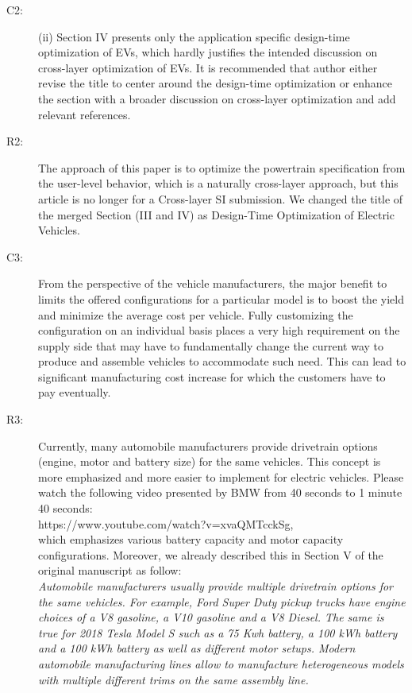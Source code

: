\documentclass[onecolumn]{IEEEconf}
\begin{document}
\begin{description}
\item [C2: ] (ii) Section IV presents only the application specific design-time optimization of EVs, which hardly justifies the intended discussion on cross-layer optimization of EVs. It is recommended that author either revise the title to center around the design-time optimization or enhance the section with a broader discussion on cross-layer optimization and add relevant references.
\item [R2: ]  The approach of this paper is to optimize the powertrain specification from the user-level behavior, which is a naturally cross-layer approach, but this article is no longer for a Cross-layer SI submission. We changed the title of the merged Section (III and IV) as Design-Time Optimization of Electric Vehicles.
~\\

\item [C3: ] From the perspective of the vehicle manufacturers, the major benefit to limits the offered configurations for a particular model is to boost the yield and minimize the average cost per vehicle. Fully customizing the configuration on an individual basis places a very high requirement on the supply side that may have to fundamentally change the current way to produce and assemble vehicles to accommodate such need. This can lead to significant manufacturing cost increase for which the customers have to pay eventually. 
\item [R3: ] Currently, many automobile manufacturers provide drivetrain options (engine, motor and battery size) for the same vehicles. This concept is more emphasized and more easier to implement for electric vehicles. Please watch the following video presented by BMW from 40 seconds to 1 minute 40 seconds: \\
https://www.youtube.com/watch?v=xvaQMTcckSg, \\
which emphasizes various battery capacity and motor capacity configurations. Moreover, we already described this in Section V of the original manuscript as follow:\\

\textit{Automobile manufacturers usually provide multiple drivetrain options for the same vehicles. For example, Ford Super Duty pickup trucks have engine choices of a V8 gasoline, a V10 gasoline and a V8 Diesel. The same is true for 2018 Tesla Model S such as a 75 Kwh battery, a 100 kWh battery and a 100 kWh battery as well as different motor setups. Modern automobile manufacturing lines allow to manufacture heterogeneous models with multiple different trims on the same assembly line.}
~\\


\end{description}
\end{document}
